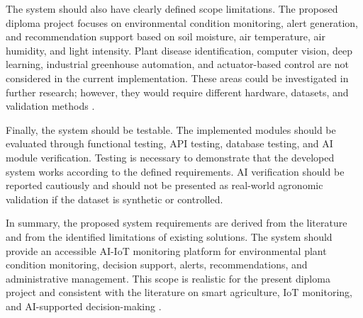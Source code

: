 The system should also have clearly defined scope limitations. The proposed diploma project focuses on environmental condition monitoring, alert generation, and recommendation support based on soil moisture, air temperature, air humidity, and light intensity. Plant disease identification, computer vision, deep learning, industrial greenhouse automation, and actuator-based control are not considered in the current implementation. These areas could be investigated in further research; however, they would require different hardware, datasets, and validation methods \cite{siddiquee2022algorithms,raju2022hydroponics,ali2024automated}.

Finally, the system should be testable. The implemented modules should be evaluated through functional testing, API testing, database testing, and AI module verification. Testing is necessary to demonstrate that the developed system works according to the defined requirements. AI verification should be reported cautiously and should not be presented as real-world agronomic validation if the dataset is synthetic or controlled.

In summary, the proposed system requirements are derived from the literature and from the identified limitations of existing solutions. The system should provide an accessible AI-IoT monitoring platform for environmental plant condition monitoring, decision support, alerts, recommendations, and administrative management. This scope is realistic for the present diploma project and consistent with the literature on smart agriculture, IoT monitoring, and AI-supported decision-making \cite{ahmed2024smart,huda2024iot,mowla2023iot,miller2025iot,nawaz2025iot}.
